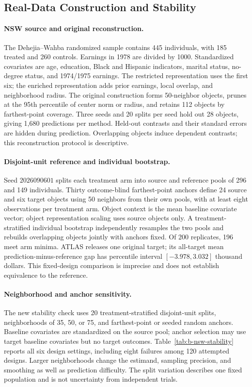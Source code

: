 \subsection{Real-Data Construction and Stability}
\label{app:nsw-details}
\label{app:real-audit}

\paragraph{NSW source and original reconstruction.}
The Dehejia--Wahba randomized sample contains 445 individuals, with 185 treated and 260 controls. Earnings in 1978 are divided by 1000. Standardized covariates are age, education, Black and Hispanic indicators, marital status, no-degree status, and 1974/1975 earnings. The restricted representation uses the first six; the enriched representation adds prior earnings, local overlap, and neighborhood radius. The original construction forms 50-neighbor objects, prunes at the 95th percentile of center norm or radius, and retains 112 objects by farthest-point coverage. Three seeds and 20 splits per seed hold out 28 objects, giving 1,680 predictions per method. Held-out contrasts and their standard errors are hidden during prediction. Overlapping objects induce dependent contrasts; this reconstruction protocol is descriptive.

\paragraph{Disjoint-unit reference and individual bootstrap.}
Seed $2026090601$ splits each treatment arm into source and reference pools of 296 and 149 individuals. Thirty outcome-blind farthest-point anchors define 24 source and six target objects using 50 neighbors from their own pools, with at least eight observations per treatment arm. Object context is the mean baseline covariate vector; object representation scaling uses source objects only. A treatment-stratified individual bootstrap independently resamples the two pools and rebuilds overlapping objects jointly with anchors fixed. Of 200 replicates, 196 meet arm minima. ATLAS releases one original target; its all-target mean prediction-minus-reference gap has percentile interval $[-3.978,3.032]$ thousand dollars. This fixed-design comparison is imprecise and does not establish equivalence to the reference.

\paragraph{Neighborhood and anchor sensitivity.}
The new stability check uses 20 treatment-stratified disjoint-unit splits, neighborhoods of 35, 50, or 75, and farthest-point or seeded random anchors. Baseline covariates are standardized on the source pool; anchor selection may use target baseline covariates but no target outcomes. Table~\ref{tab:b-nsw-stability} reports all six design settings, including eight failures among 120 attempted designs. Larger neighborhoods change the estimand, sampling precision, and smoothing as well as prediction difficulty. The split variation describes one fixed population and is not uncertainty from independent trials.


